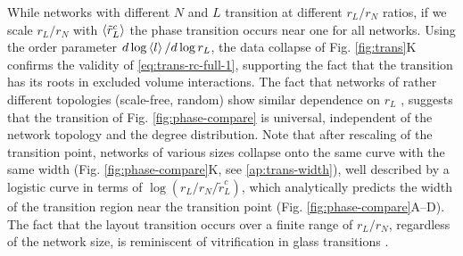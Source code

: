 \documentclass[endfloats,nofootinbib,preprint,floatfix,titlepage,superscriptaddress,linenumbers]{revtex4-1} %
\begin{document}
While networks with different $N$ and $L$ transition at different $r_L/r_N$ ratios, if we scale $r_L/r_N$ with $\left<\tilde{r}^c_L\right>$ %
the phase transition occurs near one for all networks.
Using the order parameter $d\log\left<l\right>/d\log r_L $, %
the data collapse of Fig. \ref{fig:trans}K confirms the validity of \eqref{eq:trans-rc-full-1}, 
supporting the fact that the transition has its roots in excluded volume interactions. %
The fact that networks of rather different topologies (scale-free, random) show similar dependence on $r_L$%
, suggests that the transition of Fig. \ref{fig:phase-compare} is universal, independent of the network topology and the degree distribution. 
Note that after rescaling of the transition point, networks of various sizes collapse onto the same curve with the same width %
(Fig. \ref{fig:phase-compare}K, see \ref{ap:trans-width}), well described by a logistic curve in terms of $\log(r_L/r_N/\tilde{r}^c_L)$, which analytically predicts the width of the transition region near the transition point (Fig. \ref{fig:phase-compare}A--D).
The fact 
that the layout transition occurs over a finite range of $r_L/r_N$, regardless of the network size, 
is reminiscent of vitrification in glass transitions \cite{gibbs1958nature}.
\end{document}
